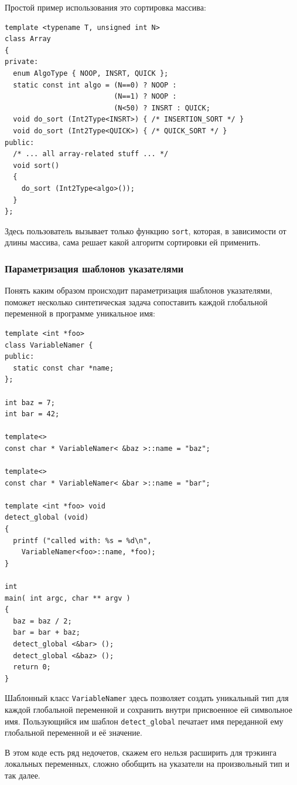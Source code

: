 \documentclass[a4paper,12pt,oneside]{article}
\begin{document}
Простой пример использования это сортировка массива:

\begin{lstlisting}
template <typename T, unsigned int N>
class Array 
{
private:
  enum AlgoType { NOOP, INSRT, QUICK };
  static const int algo = (N==0) ? NOOP : 
                          (N==1) ? NOOP :
                          (N<50) ? INSRT : QUICK;
  void do_sort (Int2Type<INSRT>) { /* INSERTION_SORT */ }
  void do_sort (Int2Type<QUICK>) { /* QUICK_SORT */ }
public:
  /* ... all array-related stuff ... */
  void sort()
  {
    do_sort (Int2Type<algo>());
  }
};
\end{lstlisting}

Здесь пользователь вызывает только функцию \lstinline!sort!, которая, в зависимости от длины массива, сама решает какой алгоритм сортировки ей применить.

\subsubsection{Параметризация шаблонов указателями}\label{PointerTemplateArguments}

Понять каким образом происходит параметризация шаблонов указателями, поможет несколько синтетическая задача сопоставить каждой глобальной переменной в программе уникальное имя:

\begin{lstlisting}
template <int *foo>
class VariableNamer {
public:
  static const char *name;
};

int baz = 7;
int bar = 42;

template<>
const char * VariableNamer< &baz >::name = "baz";

template<>
const char * VariableNamer< &bar >::name = "bar";

template <int *foo> void
detect_global (void)
{
  printf ("called with: %s = %d\n", 
    VariableNamer<foo>::name, *foo);
}

int
main( int argc, char ** argv )
{
  baz = baz / 2;
  bar = bar + baz;
  detect_global <&bar> ();
  detect_global <&baz> ();
  return 0;
}
\end{lstlisting}

Шаблонный класс \lstinline!VariableNamer! здесь позволяет создать уникальный тип для каждой глобальной переменной и сохранить внутри присвоенное ей символьное имя. Пользующийся им шаблон \lstinline!detect_global! печатает имя переданной ему глобальной переменной и её значение.

В этом коде есть ряд недочетов, скажем его нельзя расширить для трэкинга локальных переменных, сложно обобщить на указатели на произвольный тип и так далее.
\end{document}
